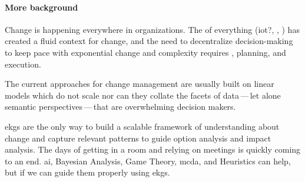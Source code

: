 %
%



\paragraph*{More background}

Change is happening everywhere in organizations.
The  of everything (\gls{iot}?, , )
has created a fluid context for change, and the need to decentralize decision-making to keep pace with
exponential change and complexity requires , planning, and execution.

The current approaches for change management are usually built on linear models which do not scale nor can they collate
the facets of data\,---\,let alone semantic perspectives\,---\,that are overwhelming decision makers.

\Glspl{ekg} are the only way to build a scalable framework of understanding about change and capture relevant patterns
to guide option analysis and impact analysis.
The days of getting in a room and relying on meetings is quickly coming to an end.
\Gls{ai}, Bayesian Analysis, Game Theory, \gls{mcda},
and Heuristics can help, but  if we can guide them properly using \glspl{ekg}.


